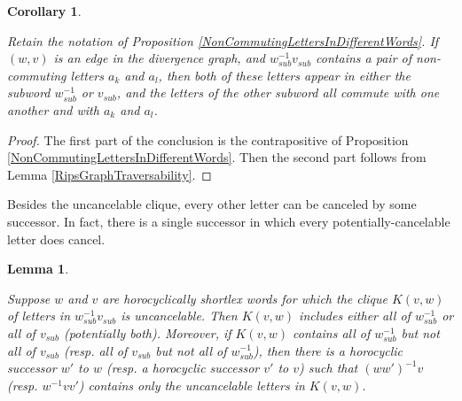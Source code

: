 \documentclass[10pt,a4paper]{amsart}
\newtheorem{lemma}[theorem]{Lemma}
\newtheorem{corollary}[theorem]{Corollary}
\theoremstyle{definition}
\theoremstyle{remark}
\begin{document}
	\begin{corollary} \label{NonCommutingLettersCor}
		
		Retain the notation of Proposition \ref{NonCommutingLettersInDifferentWords}. If $(w,v)$ is an edge in the divergence graph, and $w_{sub}^{-1}v_{sub}$ contains a pair of non-commuting letters $a_k$ and $a_l$, then both of these letters appear in either the subword $w_{sub}^{-1}$ or $v_{sub}$, and the letters of the other subword all commute with one another and with $a_k$ and $a_l$.
		
	\end{corollary}
	
	\begin{proof}
		The first part of the conclusion is the contrapositive of Proposition \ref{NonCommutingLettersInDifferentWords}. Then the second part follows from Lemma \ref{RipsGraphTraversability}.
	\end{proof}
	
	Besides the uncancelable clique, every other letter can be canceled by some successor. In fact, there is a single successor in which every potentially-cancelable letter does cancel.
	
	\begin{lemma} \label{MaximalCancellation}
		
		Suppose $w$ and $v$ are horocyclically shortlex words for which the clique $K(v,w)$ of letters in $w_{sub}^{-1}v_{sub}$ is uncancelable. Then $K(v,w)$ includes either all of $w_{sub}^{-1}$ or all of $v_{sub}$ (potentially both). Moreover, if $K(v,w)$ contains all of $w_{sub}^{-1}$ but not all of $v_{sub}$ (resp. all of $v_{sub}$ but not all of $w_{sub}^{-1}$), then there is a horocyclic successor $w'$ to $w$ (resp. a horocyclic successor $v'$ to $v$) such that $(ww')^{-1}v$ (resp. $w^{-1}vv'$) contains only the uncancelable letters in $K(v,w)$.
		
	\end{lemma}
	
\end{document}
